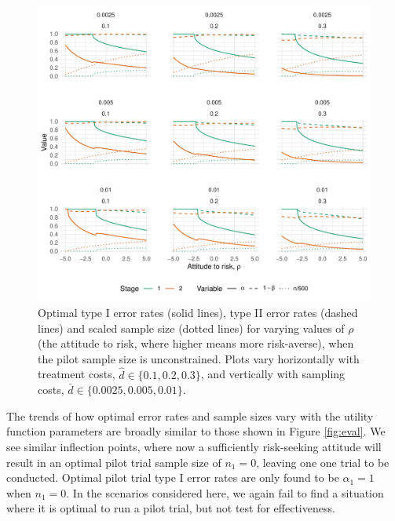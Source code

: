 \documentclass[sagev, Crown]{sagej} %
\begin{document}
\begin{figure}
\centering
\includegraphics[scale=0.8]{./Figures/eval_unrest.pdf}
\caption{Optimal type I error rates (solid lines), type II error rates (dashed lines) and scaled sample size (dotted lines) for varying values of $\rho$ (the attitude to risk, where higher means more risk-averse), when the pilot sample size is unconstrained. Plots vary horizontally with treatment costs, $\hat{d} \in \{0.1, 0.2, 0.3\}$, and vertically with sampling costs, $\bar{d} \in \{0.0025, 0.005, 0.01\}$.}
\label{fig:eval2}
\end{figure}

The trends of how optimal error rates and sample sizes vary with the utility function parameters are broadly similar to those shown in Figure \ref{fig:eval}. We see similar inflection points, where now a sufficiently risk-seeking attitude will result in an optimal pilot trial sample size of $n_1 = 0$, leaving one one trial to be conducted. Optimal pilot trial type I error rates are only found to be $\alpha_1 = 1$ when $n_1 = 0$. In the scenarios considered here, we again fail to find a situation where it is optimal to run a pilot trial, but not test for effectiveness.
\end{document}
